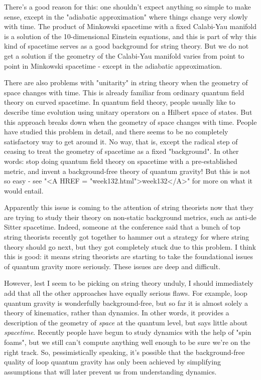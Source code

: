 There's a good reason for this: one shouldn't expect anything so simple
to make sense, except in the "adiabatic approximation" where
things change very slowly with time.  The product of Minkowski spacetime
with a fixed Calabi-Yau manifold is a solution of the 10-dimensional
Einstein equations, and this is part of why this kind of spacetime
serves as a good background for string theory.  But we do not get a
solution if the geometry of the Calabi-Yau manifold varies from point to
point in Minkowski spacetime - except in the adiabatic approximation.

There are also problems with "unitarity" in string theory when
the geometry of space changes with time.  This is already familiar from
ordinary quantum field theory on curved spacetime.  In quantum field
theory, people usually like to describe time evolution using unitary
operators on a Hilbert space of states.  But this approach breaks down
when the geometry of space changes with time.  People have studied this
problem in detail, and there seems to be no completely satisfactory way
to get around it.  No way, that is, except the radical step of ceasing
to treat the geometry of spacetime as a fixed "background".
In other words: stop doing quantum field theory on spacetime with a
pre-established metric, and invent a background-free theory of quantum
gravity!  But this is not so easy - see "<A HREF =
"week132.html">week132</A>" for more on what it would entail.

Apparently this issue is coming to the attention of string theorists now
that they are trying to study their theory on non-static background
metrics, such as anti-de Sitter spacetime.  Indeed, someone at the
conference said that a bunch of top string theorists recently got
together to hammer out a strategy for where string theory should go
next, but they got completely stuck due to this problem.   I think
this is good: it means string theorists are starting to take the
foundational issues of quantum gravity more seriously.  These issues
are deep and difficult.

However, lest I seem to be picking on string theory unduly, I should
immediately add that all the other approaches have equally serious
flaws.  For example, loop quantum gravity is wonderfully
background-free, but so far it is almost solely a theory of kinematics,
rather than dynamics.  In other words, it provides a description of the
geometry of \emph{space} at the quantum level, but says little about
\emph{spacetime}.  Recently people have begun to study dynamics with the help
of "spin foams", but we still can't compute anything well
enough to be sure we're on the right track.  So, pessimistically
speaking, it's possible that the background-free quality of loop quantum
gravity has only been achieved by simplifying assumptions that will
later prevent us from understanding dynamics.

